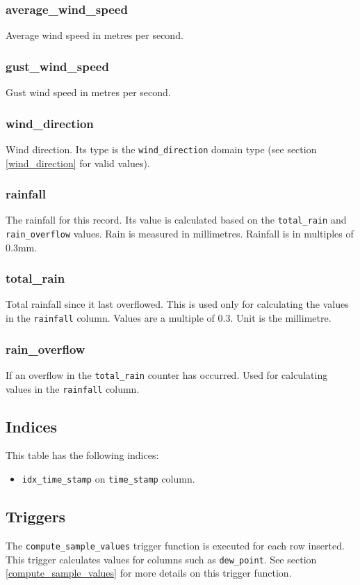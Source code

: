 \documentclass[a4paper,10pt]{book}
\begin{document}
\subsubsection{average\_wind\_speed}
Average wind speed in metres per second.

\subsubsection{gust\_wind\_speed}
Gust wind speed in metres per second.

\subsubsection{wind\_direction}
Wind direction. Its type is the \verb|wind_direction| domain type (see section \ref{wind_direction} for valid values).

\subsubsection{rainfall}
The rainfall for this record. Its value is calculated based on the \verb|total_rain| and \verb|rain_overflow| values. Rain is measured in millimetres. Rainfall is in multiples of 0.3mm.

\subsubsection{total\_rain}
Total rainfall since it last overflowed. This is used only for calculating the values in the \verb|rainfall| column. Values are a multiple of 0.3. Unit is the millimetre. 

\subsubsection{rain\_overflow}
If an overflow in the \verb|total_rain| counter has occurred. Used for calculating values in the \verb|rainfall| column.

\subsection{Indices}
This table has the following indices:
\begin{itemize}
\item \verb|idx_time_stamp| on \verb|time_stamp| column.
\end{itemize}

\subsection{Triggers}
The \verb|compute_sample_values| trigger function is executed for each row inserted. This trigger calculates values for columns such as \verb|dew_point|. See section \ref{compute_sample_values} for more details on this trigger function.
\end{document}
